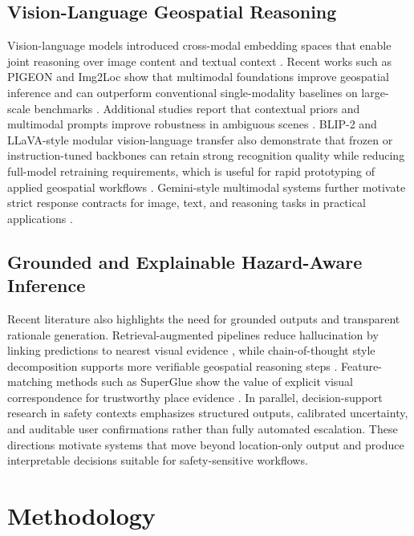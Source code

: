 \documentclass[12pt,a4paper]{article}
\begin{document}
\subsection{Vision-Language Geospatial Reasoning}
Vision-language models introduced cross-modal embedding spaces that enable joint reasoning over image content and textual context \cite{radford2021clip}. Recent works such as PIGEON and Img2Loc show that multimodal foundations improve geospatial inference and can outperform conventional single-modality baselines on large-scale benchmarks \cite{haas2024pigeon, zhou2024img2loc}. Additional studies report that contextual priors and multimodal prompts improve robustness in ambiguous scenes \cite{wang2024llmgeo, lyu2024tell}. BLIP-2 and LLaVA-style modular vision-language transfer also demonstrate that frozen or instruction-tuned backbones can retain strong recognition quality while reducing full-model retraining requirements, which is useful for rapid prototyping of applied geospatial workflows \cite{li2023blip2, liu2024llava}. Gemini-style multimodal systems further motivate strict response contracts for image, text, and reasoning tasks in practical applications \cite{team2024gemini}.

\subsection{Grounded and Explainable Hazard-Aware Inference}
Recent literature also highlights the need for grounded outputs and transparent rationale generation. Retrieval-augmented pipelines reduce hallucination by linking predictions to nearest visual evidence \cite{waheed2025vlm, li2025pixels}, while chain-of-thought style decomposition supports more verifiable geospatial reasoning steps \cite{yerramilli2025geochain, cheng2025geoguess}. Feature-matching methods such as SuperGlue show the value of explicit visual correspondence for trustworthy place evidence \cite{sarlin2020superglue}. In parallel, decision-support research in safety contexts emphasizes structured outputs, calibrated uncertainty, and auditable user confirmations rather than fully automated escalation. These directions motivate systems that move beyond location-only output and produce interpretable decisions suitable for safety-sensitive workflows.

\section{Methodology}
\end{document}
